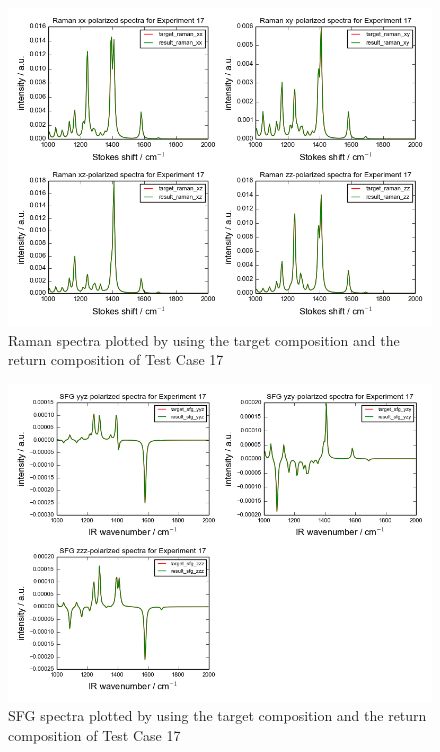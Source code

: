 \begin{figure}[!ht] 
\centering
\includegraphics[scale=0.7]{Figures/chapter4_result_target_plotting_5datapoint_raman.png}
\caption{Raman spectra plotted by using the target composition and the return composition of Test Case 17} \label{fig:4.3}
\end{figure}

\begin{figure}[!ht]
\centering
\includegraphics[scale=0.7]{Figures/chapter4_result_target_plotting_5datapoint_sfg.png}
\caption{SFG spectra plotted by using the target composition and the return composition of Test Case 17}  \label{fig:4.4}
\end{figure}

